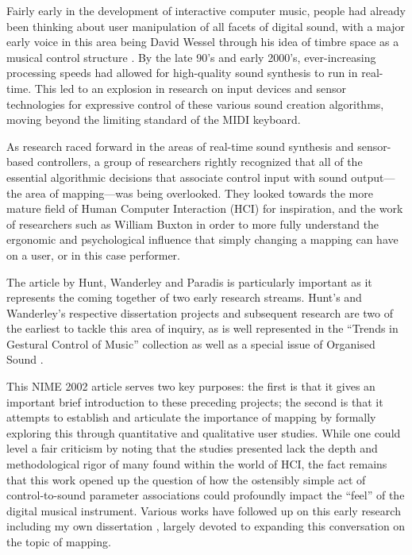 Fairly early in the development of interactive computer music, people had already been thinking about user manipulation of all facets of digital sound, with a major early voice in this area being David Wessel through his idea of timbre space as a musical control structure \cite{Wessel:1979}. By the late 90's and early 2000's, ever-increasing processing speeds had allowed for high-quality sound synthesis to run in real-time. This led to an explosion in research on input devices and sensor technologies for expressive control of these various sound creation algorithms, moving beyond the limiting standard of the MIDI keyboard. 

As research raced forward in the areas of real-time sound synthesis and sensor-based controllers, a group of researchers rightly recognized that all of the essential algorithmic decisions that associate control input with sound output---the area of mapping---was being overlooked. They looked towards the more mature field of Human Computer Interaction (HCI) for inspiration, and the work of researchers such as William Buxton in order to more fully understand the ergonomic and psychological influence that simply changing a mapping can have on a user, or in this case performer. 

The article by Hunt, Wanderley and Paradis is particularly important as it represents the coming together of two early research streams. Hunt's and Wanderley's respective dissertation projects and subsequent research are two of the earliest to tackle this area of inquiry, as is well represented in the ``Trends in Gestural Control of Music'' collection \cite{:2000c} as well as a special issue of Organised Sound \cite{Wanderley:2002}. 

This NIME 2002 article serves two key purposes: the first is that it gives an important brief introduction to these preceding projects; the second is that it attempts to establish and articulate the importance of mapping by formally exploring this through quantitative and qualitative user studies. While one could level a fair criticism by noting that the studies presented lack the depth and methodological rigor of many found within the world of HCI, the fact remains that this work opened up the question of how the ostensibly simple act of control-to-sound parameter associations could profoundly impact the ``feel'' of the digital musical instrument. Various works have followed up on this early research including my own dissertation \cite{Van-Nort:2010}, largely devoted to expanding this conversation on the topic of mapping. 

